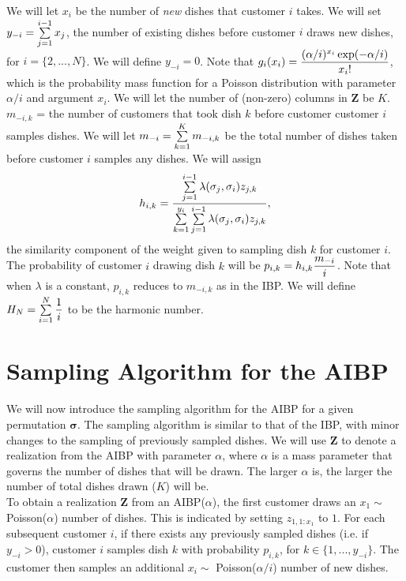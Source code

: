 \noindent
We will let $x_i$ be the number of \textit{new} dishes that customer $i$ takes.
We will set $y_{-i} = \sum\limits_{j=1}^{i-1} x_j$, the number of existing dishes
before customer $i$ draws new dishes, for $i=\{2,...,N\}$. We will define
$y_{-i} = 0$. Note that $g_i(x_i) =
\displaystyle\frac{(\alpha/i)^{x_i}\exp(-\alpha/i)}{x_i!}$, which is the probability mass
function for a Poisson distribution with parameter $\alpha/i$ and argument
$x_i$. We will let the number of (non-zero) columns in $\bm Z$ be $K$.
$m_{-i,k}$ = the number of customers that took dish $k$ before customer
customer $i$ samples dishes. We will let  $m_{-i} = \sum\limits_{k=1}^{K}m_{-i,k}$ be
the total number of dishes taken before customer $i$ samples any dishes.  We
will assign 
\[h_{i,k} = \displaystyle\frac{\sum\limits_{j=1}^{i-1}\lambda(\sigma_j,\sigma_i)z_{j,k}} {\sum\limits_{k=1}^{y_i}\sum\limits_{j=1}^{i-1}\lambda(\sigma_j,\sigma_i)z_{j,k}},\]
the similarity component of the weight given to sampling dish $k$ for customer
$i$. The probability of customer $i$ drawing dish $k$ will be $p_{i,k} =
h_{i,k} \displaystyle\frac{m_{-i}}{i}$. Note that when $\lambda$ is a constant, $p_{i,k}$
reduces to $m_{-i,k}$ as in the IBP. We will define $H_N = \sum\limits_{i=1}^{N}
\displaystyle\frac{1}{i}$ to be the harmonic number.

\section{Sampling Algorithm for the AIBP}
We will now introduce the sampling algorithm for the AIBP for a given
permutation $\bm\sigma$. The sampling algorithm is similar to that of the IBP,
with minor changes to the sampling of previously sampled dishes. We will use 
$\bm Z$ to denote a realization from the AIBP with parameter $\alpha$, where 
$\alpha$ is a mass parameter that governs the number of dishes that will be drawn.
The larger $\alpha$ is, the larger the number of total dishes drawn ($K$) will be.\\

\noindent
To obtain a realization $\bm Z$ from an AIBP($\alpha$), the first customer
draws an $x_1 \sim$ Poisson($\alpha$) number of dishes. This is indicated by
setting $z_{1,1:x_1}$ to $1$. For each subsequent customer $i$, if there exists
any previously sampled dishes (i.e. if $y_{-i}>0$), customer $i$ samples dish
$k$ with probability $p_{i,k}$, for $k \in \{1,...,y_{-i}\}$. The customer then
samples an additional $x_i \sim$ Poisson($\alpha/i$) number of new dishes. 

